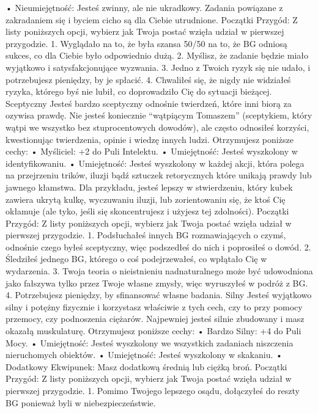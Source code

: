     • Nieumiejętność: Jesteś zwinny, ale nie ukradkowy. Zadania powiązane z zakradaniem się i byciem cicho są dla Ciebie utrudnione.
Początki Przygód: Z listy poniższych opcji, wybierz jak Twoja postać wzięła udział w pierwszej przygodzie.
1. Wyglądało na to, że była szansa 50/50 na to, że BG odniosą sukces, co dla Ciebie było odpowiednio dużą.
2. Myślisz, że zadanie będzie miało wyjątkowo i satysfakcjonujące wyzwania.
3. Jedno z Twoich ryzyk się nie udało, i potrzebujesz pieniędzy, by je spłacić.
4. Chwaliłeś się, że nigdy nie widziałeś ryzyka, którego byś nie lubił, co doprowadziło Cię do sytuacji bieżącej. 
Sceptyczny
Jesteś bardzo sceptyczny odnośnie twierdzeń, które inni biorą za ozywisa prawdę. Nie jesteś koniecznie “wątpiącym Tomaszem” (sceptykiem, który wątpi we wszystko bez stuprocentowych dowodów), ale często odnosiłeś korzyści, kwestionując twierdzenia, opinie i wiedzę innych ludzi.
Otrzymujesz poniższe cechy:
    • Myśliciel: +2 do Puli Intelektu.
    • Umiejętność: Jesteś wyszkolony w identyfikowaniu.
    • Umiejętność: Jesteś wyszkolony w każdej akcji, która polega na przejrzeniu trików, iluzji bądź sztuczek retorycznych które unikają prawdy lub jawnego kłamstwa. Dla przykładu, jesteś lepszy w stwierdzeniu, który kubek zawiera ukrytą kulkę, wyczuwaniu iluzji, lub zorientowaniu się, że ktoś Cię okłamuje (ale tyko, jeśli się skoncentrujesz i użyjesz tej zdolności).
Początki Przygód: Z listy poniższych opcji, wybierz jak Twoja postać wzięła udział w pierwszej przygodzie.
1. Podsłuchałeś innych BG rozmawiających o czymś, odnośnie czego byłeś sceptyczny, więc podszedłeś do nich i poprosiłeś o dowód.
2. Śledziłeś jednego BG, którego o coś podejrzewałeś, co wpłątało Cię w wydarzenia.
3. Twoja teoria o nieistnieniu nadnaturalnego może być udowodniona jako fałszywa tylko przez Twoje własne zmysły, więc wyruszyłeś w podróż z BG.
4. Potrzebujesz pieniędzy, by sfinansować własne badania.
Silny
Jesteś wyjątkowo silny i potężny fizycznie i korzystasz właściwie z tych cech, czy to przy pomocy przemocy, czy podnoszenia ciężarów. Najpewniej jesteś silnie zbudowany i masz okazałą muskulaturę.
Otrzymujesz poniższe cechy:
    • Bardzo Silny: +4 do Puli Mocy.
    • Umiejętność: Jesteś wyszkolony we wszystkich zadaniach niszczenia nieruchomych obiektów.
    • Umiejętność: Jesteś wyszkolony w skakaniu.
    • Dodatkowy Ekwipunek: Masz dodatkową średnią lub ciężką broń.
Początki Przygód: Z listy poniższych opcji, wybierz jak Twoja postać wzięła udział w pierwszej przygodzie.
1. Pomimo Twojego lepszego osądu, dołączyłeś do reszty BG ponieważ byli w niebezpieczeństwie.
